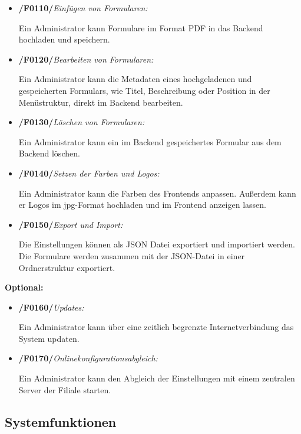     \begin{itemize}
        \item \textbf{/F0110/}\textit{Einfügen von Formularen:} \par
        Ein Administrator kann Formulare im Format PDF in das Backend hochladen und speichern.
        
        \item \textbf{/F0120/}\textit{Bearbeiten von Formularen:} \par
        Ein Administrator kann die Metadaten eines hochgeladenen und gespeicherten Formulars, wie Titel, Beschreibung oder Position in der Menüstruktur, direkt im Backend bearbeiten.
        
        \item \textbf{/F0130/}\textit{Löschen von Formularen:} \par
        Ein Administrator kann ein im Backend gespeichertes Formular aus dem Backend löschen.
        
        \item \textbf{/F0140/}\textit{Setzen der Farben und Logos:} \par 
        Ein Administrator kann die Farben des Frontends anpassen. Außerdem kann er Logos im jpg-Format hochladen und im Frontend anzeigen lassen.
        
        \item \textbf{/F0150/}\textit{Export und Import:} \par
        Die Einstellungen können als JSON Datei exportiert und importiert werden. Die Formulare werden zusammen mit der JSON-Datei in einer Ordnerstruktur exportiert.
    \end{itemize}{}
\vspace{1,5cm}
\textbf{Optional:}
    \begin{itemize}
        \item \textbf{/F0160/}\textit{Updates:} \par 
        Ein Administrator kann über eine zeitlich begrenzte Internetverbindung das System updaten.
        
        \item \textbf{/F0170/}\textit{Onlinekonfigurationsabgleich:} \par
        Ein Administrator kann den Abgleich der Einstellungen mit einem zentralen Server der Filiale starten.
    \end{itemize}
    
\newpage

\subsection{Systemfunktionen}


